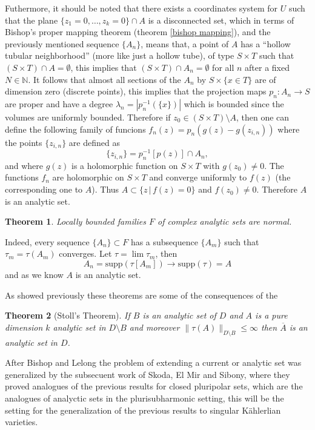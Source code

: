 \documentclass[12pt,twoside,a4paper]{report}
\newtheorem{theorem}{Theorem}[section]
\newcommand{\nat}{\ensuremath{ \mathbb N }}
\begin{document}
Futhermore, it should be noted that there exists a coordinates system for $U$ such that the plane \hbox{$\{z_1=0,\dots,z_k=0\}\cap A$} is a disconnected set, which in terms of Bishop's proper mapping theorem (theorem \ref{bishop mapping}), and the previously mentioned sequence \(\{A_n\}\), means that, a point of $A$ has a ``hollow tubular neighborhood'' (more like just a hollow tube), of type $S\times T$ such that $(S\times T)\cap A=\emptyset$, this implies that $(S\times T)\cap A_n=\emptyset$ for all $n$ after a fixed $N\in\nat$. It follows that almost all sections of the $A_n$ by $S\times\{x\in T\}$ are of dimension zero (discrete points), this implies that the projection maps $p_n:A_n\rightarrow S$ are proper and have a degree $\lambda_n=|p_n^{-1}(\{x\})|$ which is bounded since the volumes are uniformly bounded. Therefore if $z_0\in(S\times T)\setminus A$, then one can define the following family of funcions $f_n(z)=p_n(g(z)-g(z_{i,n}))$ where the points $\{z_{i,n}\}$ are defined as
\[
\{z_{i,n}\}=p_n^{-1}[p(z)]\cap A_n,
\]
and where $g(z)$ is a holomorphic function on $S\times T$ with $g(z_0)\neq0$. The functions $f_n$ are holomorphic on $S\times T$ and converge uniformly to $f(z)$ (the corresponding one to $A$). Thus $A\subset\{z\,|\,f(z)=0\}$ and $f(z_0)\neq0$. Therefore $A$ is an analytic set.

\begin{theorem}
Locally bounded families $F$ of complex analytic sets are normal.
\end{theorem}

Indeed, every sequence $\{A_n\}\subset F$ has a subsequence $\{A_m\}$ such that $\tau_m=\tau(A_m)$ converges. Let $\tau=\lim \tau_m$, then
\[
    A_n=\mathrm{supp}(\tau[A_m])\rightarrow\mathrm{supp}(\tau)=A
\]
and as we know $A$ is an analytic set.

As showed previously these theorems are some of the consequences of the  
\begin{theorem}[Stoll's Theorem] If $B$ is an analytic set of $D$ and $A$ is a pure dimension $k$ analytic set in $D\setminus B$ and moreover $\|\tau(A)\|_{D\setminus B}\leq\infty$ then $\overline{A}$ is an analytic set in $D$.
\end{theorem}
After Bishop and Lelong the problem of extending a current or analytic set was generalized by the subsecuent work of Skoda, El Mir and Sibony, where they proved analogues of the previous results for closed pluripolar sets, which are the analogues of analyctic sets in the plurisubharmonic setting, this will be the setting for the generalization of the previous results to singular Kählerlian varieties. 
\end{document}
